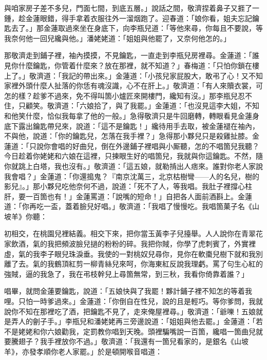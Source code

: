與咱家房子差不多兒，門面七間，到底五層。」說話之間，敬濟捏着鼻子又捱了一鍾，趁金蓮眼錯，得手拿着衣服往外一溜烟跑了。迎春道：「娘你看，姐夫忘記鑰匙去了。」那金蓮取過來坐在身底下，向李瓶兒道：「等他來尋，你每且不要說，等我奈何他一回兒纔與他。」潘姥姥道：「姐姐與他罷了，又奈何他怎的。」

那敬濟走到鋪子裡，袖內摸摸，不見鑰匙，一直走到李瓶兒房裡尋。金蓮道：「誰見你什麼鑰匙，你管着什麼來？放在那裡，就不知道？」春梅道：「只怕你鎖在樓上了。」敬濟道：「我記的帶出來。」金蓮道：「小孩兒家屁股大，敢弔了心！又不知家裡外頭什麼人扯落的你恁有魂沒識，心不在肝上。」{}敬濟道：「有人來贖衣裳，可怎的樣？趁爹不過來，免不得叫箇小爐匠來開樓門，纔知有沒。」那李瓶兒忍不住，只顧笑。敬濟道：「六娘拾了，與了我罷。」金蓮道：「也沒見這李大姐，不知和他笑什麼，恰似我每拿了他的一般。」急得敬濟只是牛回磨轉，轉眼看見金蓮身底下露出鑰匙帶兒來，說道：「這不是鑰匙！」纔待用手去取，被金蓮褪在袖內，不與他，說道：「你的鑰匙兒，怎落在我手裡？」急得那小夥兒只是殺雞扯膝。金蓮道：「只說你會唱的好曲兒，倒在外邊鋪子裡唱與小厮聽，怎的不唱箇兒我聽？今日趁着你姥姥和六娘在這裡，只揀眼生好的唱箇兒，我就與你這鑰匙。不然，隨你就跳上白塔，我也沒有。」敬濟道：「這五娘，就勒掯出人痞來。誰對你老人家說我會唱？」金蓮道：「你還搗鬼？『南京沈萬三，北京枯樹彎——人的名兒，樹的影兒』。」那小夥兒吃他奈何不過，說道：「死不了人，等我唱。我肚子裡撐心柱肝，要一百箇也有！」金蓮罵道：「說嘴的短命！」自把各人面前酒斟上。金蓮道：「你再吃一盃，蓋着臉兒好唱。」敬濟道：「我唱了慢慢吃。我唱箇菓子名《山坡羊》你聽：

\begin{myquote} 
初相交，在桃園兒裡結義。相交下來，把你當玉黃李子兒擡舉。人人說你在青翠花家飲酒，氣的我把頻波臉兒撾的粉粉的碎。我把你賊，你學了虎刺賓了，外實裡虛，氣的我李子眼兒珠淚垂。我使的一對桃奴兒尋你，見你在軟棗兒樹下就和我別離了去。氣的我鶴頂紅剪一柳青絲兒來呵，你海東紅反說我理虧。罵了句生心紅的強賊，逼的我急了，我在弔枝幹兒上尋箇無常，到三秋，我看你倚靠着誰？」
\end{myquote} 

唱畢，就問金蓮要鑰匙，說道：「五娘快與了我罷！夥計鋪子裡不知怎的等着我哩。只怕一時爹過來。」金蓮道：「你倒自在性兒，說的且是輕巧。等你爹問，我就說你不知在那裡吃了酒，把鑰匙不見了，走來俺屋裡尋。」敬濟道：「爺嚛！五娘就是弄人的劊子手。」{}李瓶兒和潘姥姥再三旁邊說道：「姐姐與他去罷。」金蓮道：「若不是姥姥和你六娘勸我，定罰教你唱到天晚。頭裡騙嘴說一百箇，纔唱一箇曲兒就要騰翅子？我手裡放你不過。」敬濟道：「我還有一箇兒看家的，是銀名《山坡羊》，亦發孝順你老人家罷。」於是頓開喉音唱道：

